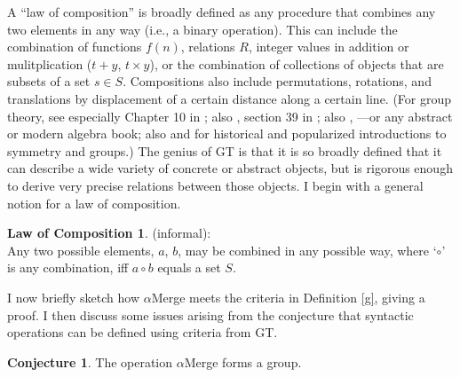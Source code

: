 \documentclass[11pt,twoside]{article}
\theoremstyle{plain}
\numberwithin{equation}{section}
\theoremstyle{definition}
\newtheorem{phrase string}{Phrase String}
\begin{document}
A ``law of composition'' is broadly defined as any procedure that combines any two elements in any way (i.e., a binary operation). This can include the combination of functions $f(n)$,  relations $R$, integer values in addition or mulitplication ($t + y$, $t \times y$), or the combination of collections of objects that are subsets of a set $s \in S$. Compositions also include permutations, rotations, and translations by displacement of a certain distance along a certain line. (For group theory, see especially Chapter 10 in \cite{pmw:1990}; also \cite{milne:2008}, section 39 in \cite{kleene:1967}; also \cite{korfhage:1974}, \cite{dornhoffhohn:1978}---or any abstract or modern algebra book; also \cite{livio:2005} and \cite{stewart:2007} for historical and popularized introductions to symmetry and groups.) The genius of GT is that it is so broadly defined that it can describe a wide variety of concrete or abstract objects, but is rigorous enough to derive very precise relations between those objects. I begin with a general notion for a law of composition.

\newtheorem*{comp}{Law of Composition}
\begin{comp}
\textsc(informal):\\
Any two possible elements, $a$, $b$, may be combined in any possible way, where `$\circ$' is any combination, iff $a \circ b$ equals a set $S$.
\end{comp}

I now briefly sketch how $\alpha$Merge meets the criteria in Definition \ref{g}, giving a proof. I then discuss some issues arising from the conjecture that syntactic operations can be defined using criteria from GT.

\newtheorem{gmerge}{Conjecture}
\begin{gmerge}
The operation $\alpha$Merge forms a group.
\end{gmerge}
\end{document}
